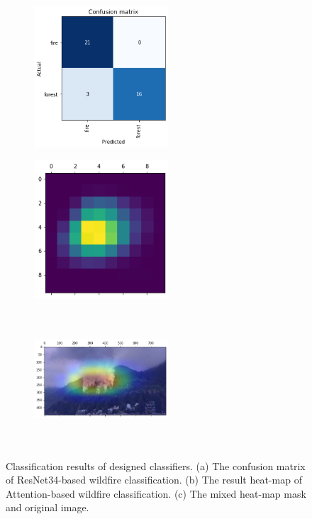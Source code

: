\begin{figure}[ht]
\centering
    \begin{subfigure}{.3\linewidth}
    \centering
        \includegraphics[width=50mm]{figs/classrensnet.png}
        \caption{}
    \end{subfigure}
    \begin{subfigure}{.3\linewidth}
    \centering
        \includegraphics[width=50mm]{figs/classattention.png}
        \caption{}
    \end{subfigure}
    \begin{subfigure}{.3\linewidth}
    \centering
        \includegraphics[width=50mm,height=50mm]{figs/classattention2.png}
        \caption{}
    \end{subfigure}
    \caption{\small Classification results of designed classifiers. (a) The confusion matrix of ResNet34-based wildfire classification. (b) The result heat-map of Attention-based wildfire classification. (c) The mixed heat-map mask and original image.}
    \label{fig:classresnetattention}
\end{figure}\par

